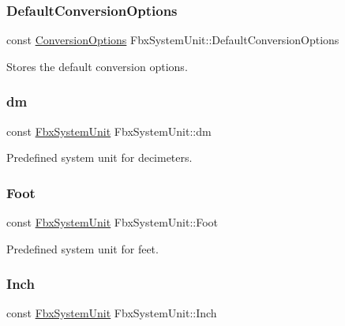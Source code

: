 \subsubsection{\texorpdfstring{Default\+Conversion\+Options}{DefaultConversionOptions}}
{\footnotesize\ttfamily const \hyperlink{struct_fbx_system_unit_1_1_conversion_options}{Conversion\+Options} Fbx\+System\+Unit\+::\+Default\+Conversion\+Options\hspace{0.3cm}{\ttfamily [static]}}



Stores the default conversion options. 

\mbox{\label{class_fbx_system_unit_a8448652c675044fb54506a4044f72814}} 
\subsubsection{\texorpdfstring{dm}{dm}}
{\footnotesize\ttfamily const \hyperlink{class_fbx_system_unit}{Fbx\+System\+Unit} Fbx\+System\+Unit\+::dm\hspace{0.3cm}{\ttfamily [static]}}



Predefined system unit for decimeters. 

\mbox{\label{class_fbx_system_unit_a94d3bfe1b4fd69a021bbaff3a61a90d5}} 
\subsubsection{\texorpdfstring{Foot}{Foot}}
{\footnotesize\ttfamily const \hyperlink{class_fbx_system_unit}{Fbx\+System\+Unit} Fbx\+System\+Unit\+::\+Foot\hspace{0.3cm}{\ttfamily [static]}}



Predefined system unit for feet. 

\mbox{\label{class_fbx_system_unit_a88862a2baeb2e510e1f39ef9d09aa0c4}} 
\subsubsection{\texorpdfstring{Inch}{Inch}}
{\footnotesize\ttfamily const \hyperlink{class_fbx_system_unit}{Fbx\+System\+Unit} Fbx\+System\+Unit\+::\+Inch\hspace{0.3cm}{\ttfamily [static]}}



